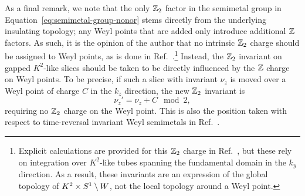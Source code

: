 As a final remark, we note that the only $\mathbb{Z}_2$ factor in the semimetal group in Equation~\eqref{eq:semimetal-group-nonor} stems directly from the underlying insulating topology; any Weyl points that are added only introduce additional $\mathbb{Z}$ factors. As such, it is the opinion of the author that no intrinsic $\mathbb{Z}_2$ charge should be assigned to Weyl points, as is done in Ref.~\cite{Fonseca-Vaidya_nonorientable}.\footnote{
	Explicit calculations are provided for this $\mathbb{Z}_2$ charge in Ref.~\cite{Fonseca-Vaidya_nonorientable}, but these rely on integration over $K^2$-like tubes spanning the fundamental domain in the $k_y$ direction. As a result, these invariants are an expression of the global topology of $K^2\times S^1\setminus W$, not the local topology around a Weyl point.}
Instead, the $\mathbb{Z}_2$ invariant on gapped $K^2$-like slices should be taken to be directly influenced by the $\mathbb{Z}$ charge on Weyl points. To be precise, if such a slice with invariant $\nu_z$ is moved over a Weyl point of charge $C$ in the $k_z$ direction, the new $\mathbb{Z}_2$ invariant is
\begin{equation*}
	\nu_z' = \nu_z + C \mod 2,
\end{equation*}
requiring no $\mathbb{Z}_2$ charge on the Weyl point. This is also the position taken with respect to time-reversal invariant Weyl semimetals in Ref.~\cite{Thiang_equivariant}.